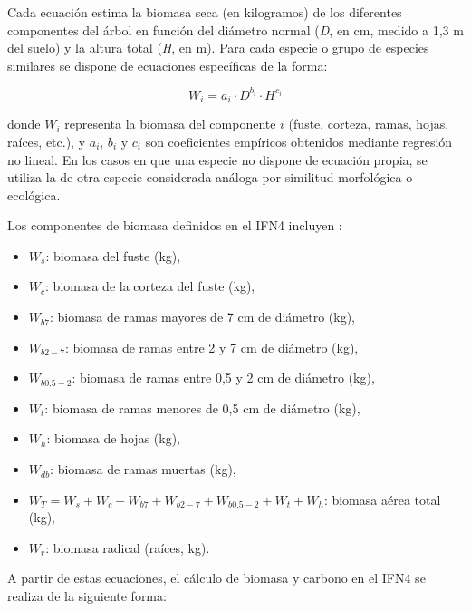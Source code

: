 \medskip

Cada ecuación estima la biomasa seca (en kilogramos) de los diferentes componentes del árbol en función del diámetro normal (\textit{D}, en cm, medido a 1,3 m del suelo) y la altura total (\textit{H}, en m). Para cada especie o grupo de especies similares se dispone de ecuaciones específicas de la forma:

\[
W_i = a_i \cdot D^{b_i} \cdot H^{c_i}
\]

donde $W_i$ representa la biomasa del componente $i$ (fuste, corteza, ramas, hojas, raíces, etc.), y $a_i$, $b_i$ y $c_i$ son coeficientes empíricos obtenidos mediante regresión no lineal. En los casos en que una especie no dispone de ecuación propia, se utiliza la de otra especie considerada análoga por similitud morfológica o ecológica.

\medskip

Los componentes de biomasa definidos en el IFN4 incluyen \cite{miteco_ifn4_manual}:

\begin{itemize}
    \item $W_s$: biomasa del fuste (kg),
    \item $W_c$: biomasa de la corteza del fuste (kg),
    \item $W_{b7}$: biomasa de ramas mayores de 7 cm de diámetro (kg),
    \item $W_{b2-7}$: biomasa de ramas entre 2 y 7 cm de diámetro (kg),
    \item $W_{b0.5-2}$: biomasa de ramas entre 0,5 y 2 cm de diámetro (kg),
    \item $W_t$: biomasa de ramas menores de 0,5 cm de diámetro (kg),
    \item $W_h$: biomasa de hojas (kg),
    \item $W_{db}$: biomasa de ramas muertas (kg),
    \item $W_T = W_s + W_c + W_{b7} + W_{b2-7} + W_{b0.5-2} + W_t + W_h$: biomasa aérea total (kg),
    \item $W_r$: biomasa radical (raíces, kg).
\end{itemize}

\medskip

\noindent
A partir de estas ecuaciones, el cálculo de biomasa y carbono en el IFN4 se realiza de la siguiente forma:

